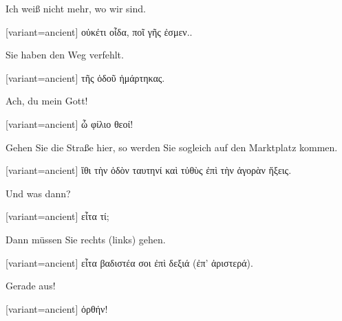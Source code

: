 Ich weiß nicht mehr, wo wir sind.

\switchcolumn

\begin{greek}[variant=ancient]%
οὐκέτι οἶδα, ποῖ γῆς ἐσμεν..

\end{greek}%
\switchcolumn*

Sie haben den Weg verfehlt.

\switchcolumn

\begin{greek}[variant=ancient]%
τῆς ὁδοῦ ἡμάρτηκας.

\end{greek}%
\switchcolumn*

Ach, du mein Gott!

\switchcolumn

\begin{greek}[variant=ancient]%
ὦ φίλιο θεοί!

\end{greek}%
\switchcolumn*

Gehen Sie die Straße hier, so werden Sie sogleich auf den Marktplatz
kommen.

\switchcolumn

\begin{greek}[variant=ancient]%
ἴθι τὴν ὁδὸν ταυτηνί καὶ τὐθὺς ἐπὶ τὴν ἀγορὰν ἥξεις.

\end{greek}%
\switchcolumn*

Und was dann?

\switchcolumn

\begin{greek}[variant=ancient]%
εἶτα τί;

\end{greek}%
\switchcolumn*

Dann müssen Sie rechts (links) gehen.

\switchcolumn

\begin{greek}[variant=ancient]%
εἶτα βαδιστέα σοι ἐπὶ δεξιά (ἐπ' ἀριστερά).

\end{greek}%
\switchcolumn*

Gerade aus!

\switchcolumn

\begin{greek}[variant=ancient]%
ὀρθήν!

\end{greek}%
\switchcolumn*

